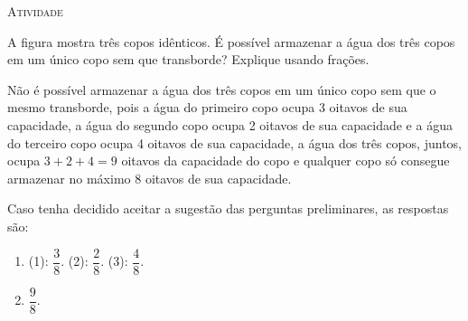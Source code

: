 \documentclass[10 pt,usenames,dvipsnames, oneside]{article}
\begin{document}
\bigskip
\begin{center}
{\large \scshape Atividade}
\end{center}
\fi

A figura mostra três copos idênticos.  É possível armazenar a água dos três copos em um único copo sem que transborde? Explique usando frações.

\begin{center}

\end{center}

\ifdefined\prof

\begin{solucao}

 Não é possível armazenar a água dos três copos em um único copo sem que o mesmo transborde, pois a água do primeiro copo ocupa 3 oitavos de sua capacidade, a água do segundo copo ocupa 2 oitavos de sua capacidade e a água do terceiro copo ocupa 4 oitavos de sua capacidade, a água dos três copos, juntos, ocupa       $3 + 2 + 4 = 9$ oitavos da capacidade do copo e qualquer copo só consegue armazenar no máximo $8$ oitavos de sua capacidade.

  Caso tenha decidido aceitar a sugestão das perguntas preliminares, as respostas são:
\begin{enumerate} [label=\alph*)] %
    \item       (1):       $\dfrac{3}{8}$. (2):       $\dfrac{2}{8}$. (3):       $\dfrac{4}{8}$.
    \item             $\dfrac{9}{8}$.
\end{enumerate} %

\end{solucao}
\fi
\end{document}
